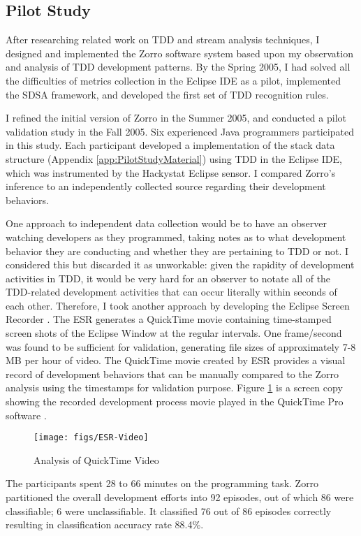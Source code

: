 \subsection{Pilot Study}
After researching related work on TDD and stream analysis techniques, I designed and implemented the Zorro software system based upon my observation and analysis of TDD development patterns. By the Spring 2005, I had solved all the difficulties of metrics collection in the Eclipse IDE as a pilot, implemented the SDSA framework, and developed the first set of TDD recognition rules. 

I refined the initial version of Zorro in the Summer 2005, and conducted a pilot validation study in the Fall 2005. Six experienced Java programmers participated in this study. Each participant developed a implementation of the stack data structure (Appendix \ref{app:PilotStudyMaterial}) using TDD in the Eclipse IDE, which was instrumented by the Hackystat Eclipse sensor. I compared Zorro's inference to an independently collected source regarding their development behaviors. 

One approach to independent data collection would be to have an observer watching developers as they programmed, taking notes as to what development behavior they are conducting and whether they are pertaining to TDD or not. I considered this but discarded it as unworkable: given the rapidity of development activities in TDD, it would be very hard for an observer to notate all of the TDD-related development activities that can occur literally within seconds of each other. Therefore, I took another approach by developing the Eclipse Screen Recorder \cite{esr}. The ESR generates a QuickTime movie containing time-stamped screen shots of the Eclipse Window at the regular intervals. One frame/second was found to be sufficient for validation, generating file sizes of approximately 7-8 MB per hour of video. The QuickTime movie created by ESR provides a visual record of development behaviors that can be manually compared to the Zorro analysis using the timestamps for validation purpose. Figure \ref{fig:ESR-Video} is a screen copy showing the recorded development process movie played in the QuickTime Pro software \cite{QuickTime}.
\begin{figure}[htbp]
  \centering
  \texttt{[image: figs/ESR-Video]}
  \caption{Analysis of QuickTime Video}
  \label{fig:ESR-Video}
\end{figure}

The participants spent 28 to 66 minutes on the programming task. Zorro partitioned the overall development efforts into 92 episodes, out of which 86 were classifiable; 6 were unclassifiable. It classified 76 out of 86 episodes correctly resulting in classification accuracy rate 88.4\%.

